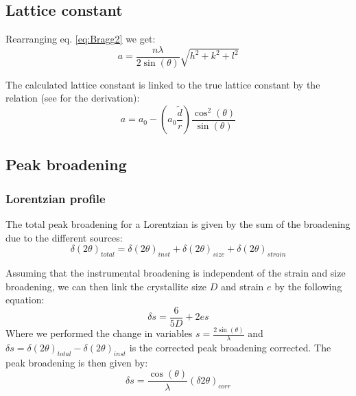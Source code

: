 \documentclass[12pt]{article}
\begin{document}
\subsection{Lattice constant}

Rearranging eq. \ref{eq:Bragg2} we get:
\begin{equation}
    a = \frac{n \lambda}{2 \sin(\theta)}\sqrt{h^2 + k^2 + l^2}
    \label{eq:LatticeConstant2}
\end{equation}

The calculated lattice constant is linked to the true lattice constant by the relation (see \cite{LabGuideXRD} for the derivation):
\begin{equation}
    a = a_0 - \left( a_0 \frac{\tilde{d}}{r} \right) \frac{\cos^2(\theta)}{\sin(\theta)}
    \label{eq:LatticeConstant1}
\end{equation}



\subsection{Peak broadening}

\subsubsection{Lorentzian profile}

The total peak broadening for a Lorentzian is given by the sum of the broadening due to the  different sources:
\begin{equation}
    \delta(2\theta)_{total} = \delta(2\theta)_{inst} + \delta(2\theta)_{size} + \delta(2\theta)_{strain} 
\end{equation}

Assuming that the instrumental broadening is independent of the strain and size broadening, we can then link the crystallite size $D$ and strain $e$ by the following equation:
\begin{equation}
    \delta s = \frac{6}{5D} + 2 e s
    \label{eq:LorentzianStrainSize}
\end{equation}
Where we performed the change in variables $s = \frac{2 \sin(\theta)}{\lambda}$ and $\delta s = \delta(2\theta)_{total} - \delta(2\theta)_{inst}$ is the corrected peak broadening corrected. The peak broadening is then given by:
\begin{equation}
    \delta s = \frac{\cos(\theta)}{\lambda}(\delta 2 \theta)_{corr}
\end{equation}
\end{document}

